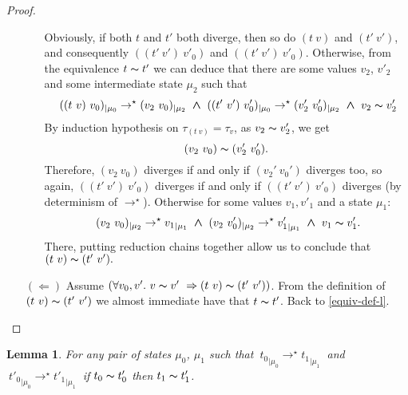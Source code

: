 \documentclass[a4paper,11pt,oneside]{article}
\theoremstyle{plain}
\newtheorem{lemma}[definition]{Lemma}
\newcommand{\tmapp}[2]{(#1 ~ #2)}
\newcommand{\ty}[1][]{\tau_{#1}}
\newcommand{\bwedge}{\boldsymbol{\wedge}}
\newcommand{\evalstar}[4]{~#1_{|\mu_#2} \rightarrow^{\star} #3_{|\mu_#4} ~}
\newcommand{\eqv}[1]{#1 \thicksim #1'}
\begin{document}
\begin{proof}
\begin{itemize}
\begin{itemize}
		Obviously, if both $t$ and $t'$ both diverge,
		then so do $\tmapp{t}{v}$ and $\tmapp{t'}{v'}$, and consequently 
		$\tmapp{\tmapp{t'}{v'}}{v'_0}$ and $\tmapp{\tmapp{t'}{v'}}{v'_0}$.
		Otherwise, from the equivalence $\eqv{t}$ we can deduce that there are
		some values $v_2$, $v'_2$ and some intermediate state $\mu_2$ such that
		$$\evalstar{\tmapp{\tmapp{t}{v}}{v_0}}{0}{\tmapp{v_2}{v_0}}{2} \bwedge
		\evalstar{\tmapp{\tmapp{t'}{v'}}{v'_0}}{0}{\tmapp{v'_2}{v'_0}}{2} 
		\bwedge~\eqv{v_2}$$	
		By induction hypothesis on $\ty[\tmapp{t}{v}]=\ty[v]$, as $\eqv{v_2}$, we 
		get	$$ \tmapp{v_2}{v_0} \thicksim \tmapp{v'_2}{v'_0}.$$ Therefore, 
		$\tmapp{v_2}{v_0}$ diverges if and only if $\tmapp{v_2'}{v_0'}$ diverges 
		too, so again, $\tmapp{\tmapp{t'}{v'}}{v'_0}$ diverges if and only if 
		$\tmapp{\tmapp{t'}{v'}}{v'_0}$ diverges (by determinism of 
		$\rightarrow^\star$). Otherwise for some values $v_1, v'_1$ and a state
		$\mu_1$:
		$$\evalstar{\tmapp{v_2}{v_0}}{2}{{v_1}}{1} \bwedge
		\evalstar{\tmapp{v_2}{v'_0}}{2}{{v'_1}}{1} 
		\bwedge~\eqv{v_1}.$$ There, putting reduction chains together allow us to 
		conclude that $\tmapp{t}{v} \thicksim \tmapp{t'}{v'}.$ 
		\end{itemize}
		
	
		\item[$(\Leftarrow)$] Assume $(\forall v_0, v'.~\eqv{v}~\Rightarrow
		\tmapp{t}{v} \thicksim \tmapp{t'}{v'})$. From the definition of 
		\mbox{$\tmapp{t}{v}\thicksim\tmapp{t'}{v'}$} we almost immediate have 
		that $\eqv{t}$. Back to \ref{equiv-def-l}.
				
		\end{itemize}	
	\end{proof}

	\begin{lemma}
		For any pair of states $\mu_0$, $\mu_1$ such that
		$\evalstar{{t_0}}{0}{{t_1}}{1}$ and $\evalstar{{t'_0}}{0}{{t'_1}}{1}$
		if $\eqv{t_0}$ then $\eqv{t_1}$.
		\label{equiv-red2-p}
	\end{lemma}
	
\end{document}
